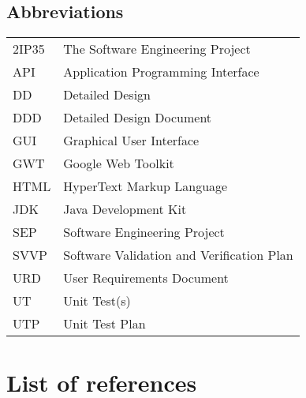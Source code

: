\subsection{Abbreviations}
\begin{tabular}{l|l}
2IP35 & The Software Engineering Project \\
API & Application Programming Interface \\
DD & Detailed Design \\
DDD & Detailed Design Document \\
GUI & Graphical User Interface \\
GWT   & Google Web Toolkit \\
HTML & HyperText Markup Language \\
JDK   & Java Development Kit \\
SEP   & Software Engineering Project \\
SVVP & Software Validation and Verification Plan \\
URD   & User Requirements Document \\
UT    & Unit Test(s) \\
UTP & Unit Test Plan \\
\end{tabular}

\section{List of references}


